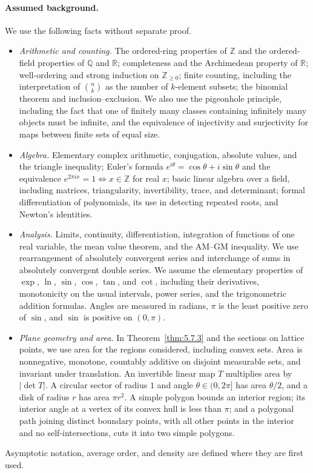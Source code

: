 \documentclass[11pt]{article}
\theoremstyle{ntstyle}
\begin{document}
\paragraph*{Assumed background.}
We use the following facts without separate proof.
\begin{itemize}
  \item \emph{Arithmetic and counting.} The ordered-ring properties of $\mathbb{Z}$ and the ordered-field properties of $\mathbb{Q}$ and $\mathbb{R}$; completeness and the Archimedean property of $\mathbb{R}$; well-ordering and strong induction on $\mathbb{Z}_{\ge0}$; finite counting, including the interpretation of $\binom{n}{k}$ as the number of $k$-element subsets; the binomial theorem and inclusion--exclusion. We also use the pigeonhole principle, including the fact that one of finitely many classes containing infinitely many objects must be infinite, and the equivalence of injectivity and surjectivity for maps between finite sets of equal size.
  \item \emph{Algebra.} Elementary complex arithmetic, conjugation, absolute values, and the triangle inequality; Euler's formula $e^{i\theta}=\cos\theta+i\sin\theta$ and the equivalence $e^{2\pi i x}=1\iff x\in\mathbb{Z}$ for real $x$; basic linear algebra over a field, including matrices, triangularity, invertibility, trace, and determinant; formal differentiation of polynomials, its use in detecting repeated roots, and Newton's identities.
  \item \emph{Analysis.} Limits, continuity, differentiation, integration of functions of one real variable, the mean value theorem, and the AM--GM inequality. We use rearrangement of absolutely convergent series and interchange of sums in absolutely convergent double series. We assume the elementary properties of $\exp$, $\ln$, $\sin$, $\cos$, $\tan$, and $\cot$, including their derivatives, monotonicity on the usual intervals, power series, and the trigonometric addition formulas. Angles are measured in radians, $\pi$ is the least positive zero of $\sin$, and $\sin$ is positive on $(0,\pi)$.
  \item \emph{Plane geometry and area.} In Theorem~\ref{thm:5.7.3} and the sections on lattice points, we use area for the regions considered, including convex sets. Area is nonnegative, monotone, countably additive on disjoint measurable sets, and invariant under translation. An invertible linear map $T$ multiplies area by $|\det T|$. A circular sector of radius $1$ and angle $\theta\in(0,2\pi]$ has area $\theta/2$, and a disk of radius $r$ has area $\pi r^2$. A simple polygon bounds an interior region; its interior angle at a vertex of its convex hull is less than $\pi$; and a polygonal path joining distinct boundary points, with all other points in the interior and no self-intersections, cuts it into two simple polygons.
\end{itemize}
Asymptotic notation, average order, and density are defined where they are first used.
\end{document}
